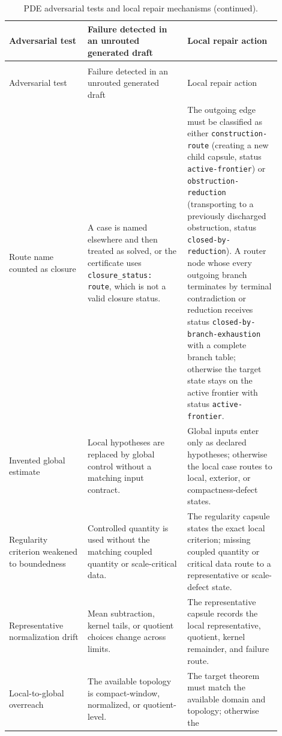 \documentclass[11pt]{article}
\theoremstyle{plain}
\theoremstyle{definition}
\theoremstyle{remark}
\begin{document}
\begingroup
\small
\begin{longtable}{@{}L{0.26\linewidth}L{0.33\linewidth}L{0.31\linewidth}@{}}
\caption{PDE adversarial tests and local repair mechanisms.}
\label{tab:pde-failure-modes-routed-repairs}\\
\toprule
Adversarial test & Failure detected in an unrouted generated draft & Local repair action \\
\midrule
\endfirsthead
\caption[]{PDE adversarial tests and local repair mechanisms (continued).}\\
\toprule
Adversarial test & Failure detected in an unrouted generated draft & Local repair action \\
\midrule
\endhead
Route name counted as closure &
A case is named elsewhere and then treated as solved, or the certificate uses
\texttt{closure\_status: route}, which is not a valid closure status. &
The outgoing edge must be classified as either \texttt{construction-route}
(creating a new child capsule, status \texttt{active-frontier}) or
\texttt{obstruction-reduction} (transporting to a previously discharged
obstruction, status \texttt{closed-by-reduction}).  A router node whose every
outgoing branch terminates by terminal contradiction or reduction receives
status \texttt{closed-by-branch-exhaustion} with a complete branch table;
otherwise the target state stays on the active frontier with status
\texttt{active-frontier}. \\
\addlinespace
Invented global estimate &
Local hypotheses are replaced by global control without a matching input
contract. &
Global inputs enter only as declared hypotheses; otherwise the local case routes to
local, exterior, or compactness-defect states. \\
\addlinespace
Regularity criterion weakened to boundedness &
Controlled quantity is used without the matching coupled quantity or scale-critical
data. &
The regularity capsule states the exact local criterion; missing coupled quantity or
critical data route to a representative or scale-defect state. \\
\addlinespace
Representative normalization drift &
Mean subtraction, kernel tails, or quotient choices change across limits. &
The representative capsule records the local representative, quotient, kernel
remainder, and failure route. \\
\addlinespace
Local-to-global overreach &
The available topology is compact-window, normalized, or quotient-level. &
The target theorem must match the available domain and topology; otherwise the

\end{longtable}
\end{document}
